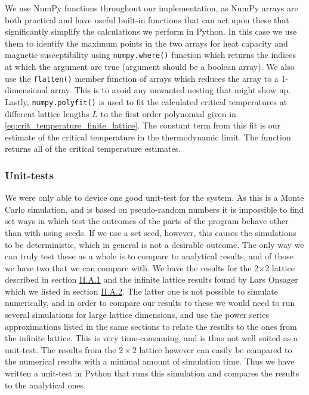 \documentclass[reprint,english,notitlepage]{revtex4-1}  %
\begin{document}
We use NumPy \citep{numpy} functions throughout our implementation, as NumPy arrays are both practical and have useful built-in functions that can act upon these that significantly simplify the calculations we perform in Python. In this case we use them to identify the maximum points in the two arrays for heat capacity and magnetic susceptibility using \verb+numpy.where()+ function which returns the indices at which the argument are true (argument should be a boolean array). We also use the \verb+flatten()+ member function of arrays which reduces the array to a 1-dimensional array. This is to avoid any unwanted nesting that might show up. Lastly, \verb+numpy.polyfit()+ is used to fit the calculated critical temperatures at different lattice lengths $L$ to the first order polynomial given in \eqref{eq:crit_temperature_finite_lattice}. The constant term from this fit is our estimate of the critical temperature in the thermodynamic limit. The function returns all of the critical temperature estimates.


\subsubsection{Unit-tests}

We were only able to device one good unit-test for the system. As this is a Monte Carlo simulation, and is based on pseudo-random numbers it is impossible to find set ways in which test the outcomes of the parts of the program behave other than with using seeds. If we use a set seed, however, this causes the simulations to be deterministic, which in general is not a desirable outcome. The only way we can truly test these as a whole is to compare to analytical results, and of those we have two that we can compare with. We have the results for the 2$\times$2 lattice described in section \hyperref[sec:II.A.i]{II.A.1} and the infinite lattice results found by Lars Onsager \citep{L.Onsager1944} which we listed in section \hyperref[sec:II.A.ii]{II.A.2}. The latter one is not possible to simulate numerically, and in order to compare our results to these we would need to run several simulations for large lattice dimensions, and use the power series approximations listed in the same sections to relate the results to the ones from the infinite lattice. This is very time-consuming, and is thus not well suited as a unit-test. The results from the $2\times2$ lattice however can easily be compared to the numerical results with a minimal amount of simulation time. Thus we have written a unit-test in Python that runs this simulation and compares the results to the analytical ones.     
\end{document}
